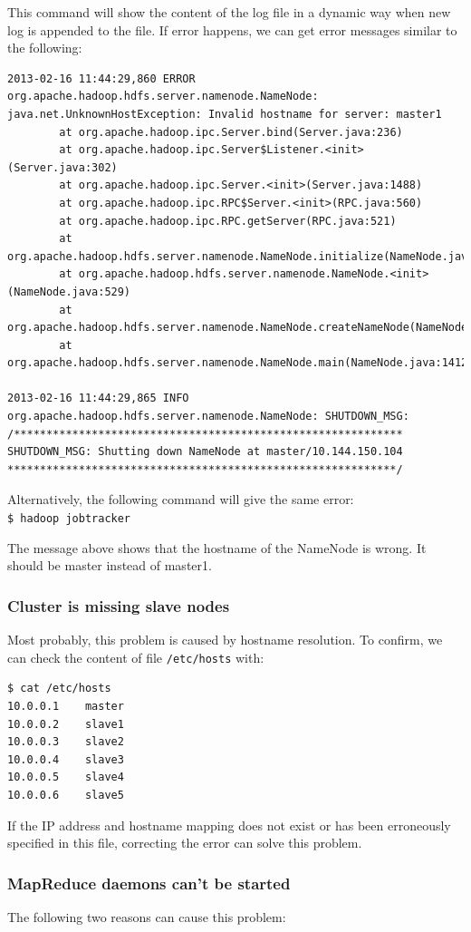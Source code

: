 This command will show the content of the log file in a dynamic way when new log is appended to the file. If error happens, we can get error messages similar to the following:
\begin{verbatim}
2013-02-16 11:44:29,860 ERROR org.apache.hadoop.hdfs.server.namenode.NameNode: java.net.UnknownHostException: Invalid hostname for server: master1
        at org.apache.hadoop.ipc.Server.bind(Server.java:236)
        at org.apache.hadoop.ipc.Server$Listener.<init>(Server.java:302)
        at org.apache.hadoop.ipc.Server.<init>(Server.java:1488)
        at org.apache.hadoop.ipc.RPC$Server.<init>(RPC.java:560)
        at org.apache.hadoop.ipc.RPC.getServer(RPC.java:521)
        at org.apache.hadoop.hdfs.server.namenode.NameNode.initialize(NameNode.java:295)
        at org.apache.hadoop.hdfs.server.namenode.NameNode.<init>(NameNode.java:529)
        at org.apache.hadoop.hdfs.server.namenode.NameNode.createNameNode(NameNode.java:1403)
        at org.apache.hadoop.hdfs.server.namenode.NameNode.main(NameNode.java:1412)

2013-02-16 11:44:29,865 INFO org.apache.hadoop.hdfs.server.namenode.NameNode: SHUTDOWN_MSG:
/************************************************************
SHUTDOWN_MSG: Shutting down NameNode at master/10.144.150.104
************************************************************/
\end{verbatim}

Alternatively, the following command will give the same error: \\
\verb|$ hadoop jobtracker|

The message above shows that the hostname of the NameNode is wrong. It should be master instead of master1.

\subsubsection*{Cluster is missing slave nodes}
Most probably, this problem is caused by hostname resolution. To confirm, we can check the content of file \verb|/etc/hosts| with:
\begin{verbatim}
$ cat /etc/hosts
10.0.0.1	master
10.0.0.2	slave1
10.0.0.3	slave2
10.0.0.4	slave3
10.0.0.5	slave4
10.0.0.6	slave5
\end{verbatim}

If the IP address and hostname mapping does not exist or has been erroneously specified in this file, correcting the error can solve this problem.
\subsubsection*{MapReduce daemons can't be started}
The following two reasons can cause this problem:

